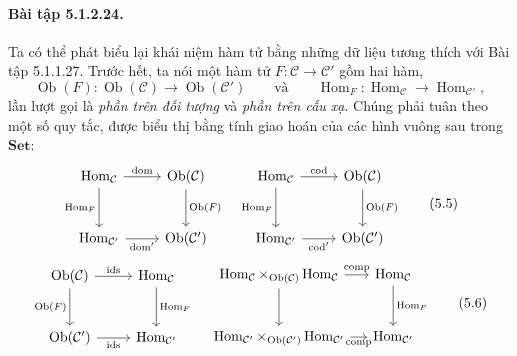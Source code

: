 \paragraph{Bài tập 5.1.2.24.} Ta có thể phát biểu lại khái niệm hàm tử bằng những dữ liệu tương thích với Bài tập 5.1.1.27. Trước hết, ta nói một hàm tử $F:\mathcal C\to\mathcal C'$ gồm hai hàm,
\[\operatorname{Ob}(F):\operatorname{Ob}(\mathcal C)\to\operatorname{Ob}(\mathcal C')\qquad\text{và}\qquad\operatorname{Hom}_F:\operatorname{Hom}_{\mathcal C}\to\operatorname{Hom}_{\mathcal C'},\]
lần lượt gọi là \emph{phần trên đối tượng} và \emph{phần trên cấu xạ}. Chúng phải tuân theo một số quy tắc, được biểu thị bằng tính giao hoán của các hình vuông sau trong $\mathbf{Set}$:
\begin{equation*}
\begin{tikzcd}[row sep=large]
\operatorname{Hom}_{\mathcal C}\arrow[r,"\operatorname{dom}"]\arrow[d,"\operatorname{Hom}_F"']&\operatorname{Ob}(\mathcal C)\arrow[d,"\operatorname{Ob}(F)"]\\
\operatorname{Hom}_{\mathcal C'}\arrow[r,"\operatorname{dom}'"']&\operatorname{Ob}(\mathcal C')
\end{tikzcd}\quad
\begin{tikzcd}[row sep=large]
\operatorname{Hom}_{\mathcal C}\arrow[r,"\operatorname{cod}"]\arrow[d,"\operatorname{Hom}_F"']&\operatorname{Ob}(\mathcal C)\arrow[d,"\operatorname{Ob}(F)"]\\
\operatorname{Hom}_{\mathcal C'}\arrow[r,"\operatorname{cod}'"']&\operatorname{Ob}(\mathcal C')
\end{tikzcd}\tag{5.5}
\end{equation*}
\begin{equation*}
\begin{tikzcd}[row sep=large]
\operatorname{Ob}(\mathcal C)\arrow[r,"\operatorname{ids}"]\arrow[d,"\operatorname{Ob}(F)"']&\operatorname{Hom}_{\mathcal C}\arrow[d,"\operatorname{Hom}_F"]\\
\operatorname{Ob}(\mathcal C')\arrow[r,"\operatorname{ids}"']&\operatorname{Hom}_{\mathcal C'}
\end{tikzcd}\quad
\begin{tikzcd}[column sep=small,row sep=large]
\operatorname{Hom}_{\mathcal C}\times_{\operatorname{Ob}(\mathcal C)}\operatorname{Hom}_{\mathcal C}\arrow[r,"\operatorname{comp}"]\arrow[d]&\operatorname{Hom}_{\mathcal C}\arrow[d,"\operatorname{Hom}_F"]\\
\operatorname{Hom}_{\mathcal C'}\times_{\operatorname{Ob}(\mathcal C')}\operatorname{Hom}_{\mathcal C'}\arrow[r,"\operatorname{comp}"']&\operatorname{Hom}_{\mathcal C'}
\end{tikzcd}\tag{5.6}
\end{equation*}
